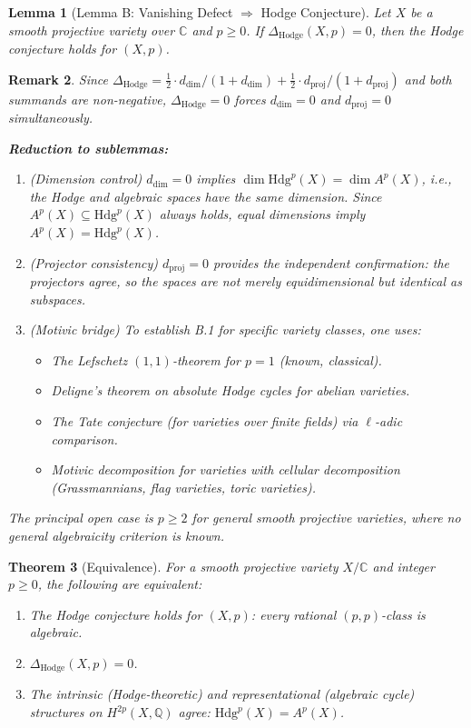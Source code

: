 \documentclass[11pt]{article}
\newtheorem{theorem}{Theorem}[section]
\newtheorem{lemma}[theorem]{Lemma}
\newtheorem{remark}[theorem]{Remark}
\theoremstyle{definition}
\begin{document}
\begin{lemma}[Lemma B: Vanishing Defect $\Rightarrow$ Hodge Conjecture]
\label{lem:hodge-B}
Let $X$ be a smooth projective variety over $\mathbb{C}$ and $p \geq 0$. If $\Delta_{\mathrm{Hodge}}(X, p) = 0$, then the Hodge conjecture holds for $(X, p)$.
\end{lemma}

\begin{remark}
Since $\Delta_{\mathrm{Hodge}} = \tfrac{1}{2} \cdot d_{\mathrm{dim}}/(1 + d_{\mathrm{dim}}) + \tfrac{1}{2} \cdot d_{\mathrm{proj}}/(1 + d_{\mathrm{proj}})$ and both summands are non-negative, $\Delta_{\mathrm{Hodge}} = 0$ forces $d_{\mathrm{dim}} = 0$ and $d_{\mathrm{proj}} = 0$ simultaneously.

\medskip
\noindent\textbf{Reduction to sublemmas:}
\begin{enumerate}
  \item[\textbf{B.1}] \emph{(Dimension control)} $d_{\mathrm{dim}} = 0$ implies $\dim \mathrm{Hdg}^p(X) = \dim A^p(X)$, i.e., the Hodge and algebraic spaces have the same dimension. Since $A^p(X) \subseteq \mathrm{Hdg}^p(X)$ always holds, equal dimensions imply $A^p(X) = \mathrm{Hdg}^p(X)$.
  \item[\textbf{B.2}] \emph{(Projector consistency)} $d_{\mathrm{proj}} = 0$ provides the independent confirmation: the projectors agree, so the spaces are not merely equidimensional but identical as subspaces.
  \item[\textbf{B.3}] \emph{(Motivic bridge)} To establish B.1 for specific variety classes, one uses:
    \begin{itemize}
      \item The Lefschetz $(1,1)$-theorem for $p = 1$ (known, classical).
      \item Deligne's theorem on absolute Hodge cycles for abelian varieties.
      \item The Tate conjecture (for varieties over finite fields) via $\ell$-adic comparison.
      \item Motivic decomposition for varieties with cellular decomposition (Grassmannians, flag varieties, toric varieties).
    \end{itemize}
\end{enumerate}
The principal open case is $p \geq 2$ for general smooth projective varieties, where no general algebraicity criterion is known.
\end{remark}

\begin{theorem}[Equivalence]
\label{thm:hodge-equiv}
For a smooth projective variety $X/\mathbb{C}$ and integer $p \geq 0$, the following are equivalent:
\begin{enumerate}
  \item[(i)] The Hodge conjecture holds for $(X, p)$: every rational $(p,p)$-class is algebraic.
  \item[(ii)] $\Delta_{\mathrm{Hodge}}(X, p) = 0$.
  \item[(iii)] The intrinsic (Hodge-theoretic) and representational (algebraic cycle) structures on $H^{2p}(X, \mathbb{Q})$ agree: $\mathrm{Hdg}^p(X) = A^p(X)$.
\end{enumerate}
\end{theorem}
\end{document}
